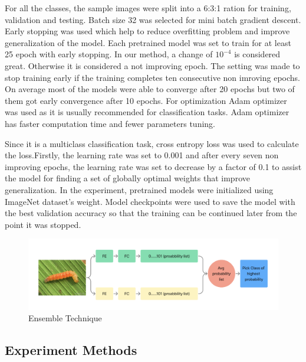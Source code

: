 For all the classes, the sample images were split into a 6:3:1 ration for training, validation and testing. Batch size 32 was selected for mini batch gradient descent. Early stopping was used which help to reduce overfitting problem and improve generalization of the model. Each pretrained model was set to train for at least 25 epoch with early stopping. In our method, a change of \(10^{-4}\) is considered great. Otherwise it is considered a not improving epoch. The setting was made to stop training early if the training completes ten consecutive non imroving epochs. On average most of the models were able to converge after 20 epochs but two of them got early convergence after 10 epochs. For optimization Adam optimizer was used as it is usually recommended for classification tasks. Adam optimizer has faster computation time and fewer parameters tuning.

Since it is a multiclass classification task, cross entropy loss was used to calculate the loss.Firstly, the learning rate was set to 0.001 and after every seven non improving epochs, the learning rate was set to decrease by a factor of 0.1 to assist the model for finding a set of globally optimal weights that improve generalization. In the experiment, pretrained models were initialized using ImageNet dataset’s weight. Model checkpoints were used to save the model with the best validation accuracy so that the training can be continued later from the point it was stopped.

\begin{figure}
    \centering
    \includegraphics[scale=0.5]{figures/ensemble_model.png}
    \caption{Ensemble Technique}
    \label{fig:my_label}
\end{figure}

\subsection{Experiment Methods}
